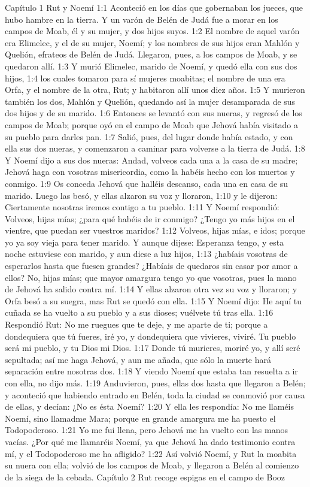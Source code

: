 Capítulo 1
Rut y Noemí  
1:1 Aconteció en los días que gobernaban los jueces, que hubo hambre en la tierra. Y un varón de Belén de Judá fue a morar en los campos de Moab, él y su mujer, y dos hijos suyos.  
1:2 El nombre de aquel varón era Elimelec, y el de su mujer, Noemí; y los nombres de sus hijos eran Mahlón y Quelión, efrateos de Belén de Judá. Llegaron, pues, a los campos de Moab, y se quedaron allí.  
1:3 Y murió Elimelec, marido de Noemí, y quedó ella con sus dos hijos,  
1:4 los cuales tomaron para sí mujeres moabitas; el nombre de una era Orfa, y el nombre de la otra, Rut; y habitaron allí unos diez años.  
1:5 Y murieron también los dos, Mahlón y Quelión, quedando así la mujer desamparada de sus dos hijos y de su marido.  
1:6 Entonces se levantó con sus nueras, y regresó de los campos de Moab; porque oyó en el campo de Moab que Jehová había visitado a su pueblo para darles pan.  
1:7 Salió, pues, del lugar donde había estado, y con ella sus dos nueras, y comenzaron a caminar para volverse a la tierra de Judá.  
1:8 Y Noemí dijo a sus dos nueras: Andad, volveos cada una a la casa de su madre; Jehová haga con vosotras misericordia, como la habéis hecho con los muertos y conmigo.  
1:9 Os conceda Jehová que halléis descanso, cada una en casa de su marido. Luego las besó, y ellas alzaron su voz y lloraron,  
1:10 y le dijeron: Ciertamente nosotras iremos contigo a tu pueblo.  
1:11 Y Noemí respondió: Volveos, hijas mías; ¿para qué habéis de ir conmigo? ¿Tengo yo más hijos en el vientre, que puedan ser vuestros maridos?  
1:12 Volveos, hijas mías, e idos; porque yo ya soy vieja para tener marido. Y aunque dijese: Esperanza tengo, y esta noche estuviese con marido, y aun diese a luz hijos,  
1:13 ¿habíais vosotras de esperarlos hasta que fuesen grandes? ¿Habíais de quedaros sin casar por amor a ellos? No, hijas mías; que mayor amargura tengo yo que vosotras, pues la mano de Jehová ha salido contra mí.  
1:14 Y ellas alzaron otra vez su voz y lloraron; y Orfa besó a su suegra, mas Rut se quedó con ella.  
1:15 Y Noemí dijo: He aquí tu cuñada se ha vuelto a su pueblo y a sus dioses; vuélvete tú tras ella.  
1:16 Respondió Rut: No me ruegues que te deje, y me aparte de ti; porque a dondequiera que tú fueres, iré yo, y dondequiera que vivieres, viviré. Tu pueblo será mi pueblo, y tu Dios mi Dios.  
1:17 Donde tú murieres, moriré yo, y allí seré sepultada; así me haga Jehová, y aun me añada, que sólo la muerte hará separación entre nosotras dos. 
1:18 Y viendo Noemí que estaba tan resuelta a ir con ella, no dijo más.  
1:19 Anduvieron, pues, ellas dos hasta que llegaron a Belén; y aconteció que habiendo entrado en Belén, toda la ciudad se conmovió por causa de ellas, y decían: ¿No es ésta Noemí?  
1:20 Y ella les respondía: No me llaméis Noemí, sino llamadme Mara; porque en grande amargura me ha puesto el Todopoderoso.  
1:21 Yo me fui llena, pero Jehová me ha vuelto con las manos vacías. ¿Por qué me llamaréis Noemí, ya que Jehová ha dado testimonio contra mí, y el Todopoderoso me ha afligido?  
1:22 Así volvió Noemí, y Rut la moabita su nuera con ella; volvió de los campos de Moab, y llegaron a Belén al comienzo de la siega de la cebada.  
Capítulo 2
Rut recoge espigas en el campo de Booz  

